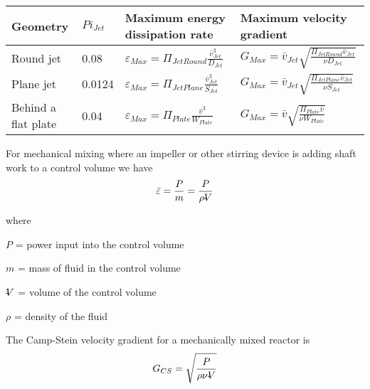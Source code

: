 \documentclass[letterpaper,10pt,english]{sphinxmanual}
\begin{document}
\begin{savenotes}\sphinxattablestart
\raggedright
{}
\label{\detokenize{Rapid_Mix/RM_Intro:id15}}\label{\detokenize{Rapid_Mix/RM_Intro:table-edr-g-equations}}
\sphinxaftercaption
\begin{tabulary}{\linewidth}[t]{|T|T|T|T|}
\hline
\sphinxstyletheadfamily 
Geometry
&
\(Pi_{Jet}\)
&\sphinxstyletheadfamily 
Maximum energy dissipation rate
&\sphinxstyletheadfamily 
Maximum velocity gradient
\\
\hline
Round jet
&
0.08
&
\(\varepsilon_{Max} = \Pi_{JetRound}\frac{   \bar v_{Jet} ^3}{D_{Jet}}\)
&
\(G_{Max} = \bar v_{Jet} \sqrt{\frac{\Pi_{JetRound} \bar v_{Jet} }{\nu D_{Jet}}}\)
\\
\hline
Plane jet
&
0.0124
&
\(\varepsilon_{Max} = \Pi_{JetPlane} \frac{  \bar v_{Jet} ^3}{S_{Jet}}\)
&
\(G_{Max} = \bar v_{Jet}\sqrt{\frac{\Pi_{JetPlane} \bar v_{Jet}}{\nu S_{Jet}}}\)
\\
\hline
Behind a flat plate
&
0.04
&
\(\varepsilon _{Max} = \Pi_{Plate}\frac{\bar v^3}{W_{Plate}}\)
&
\(G_{Max} = \bar v\sqrt{\frac{\Pi_{Plate} \bar v}{\nu W_{Plate}}}\)
\\
\hline
\end{tabulary}
\par
\sphinxattableend\end{savenotes}

For mechanical mixing where an impeller or other stirring device is adding shaft work to a control volume we have
\begin{equation}\label{equation:Rapid_Mix/RM_Intro:Rapid_Mix/RM_Intro:7}
\begin{split}\bar\varepsilon = \frac{P}{m} = \frac{P}{\rho \rlap{-}V}\end{split}
\end{equation}
\begin{DUlineblock}{0em}
\item[] where
\item[] \(P\) = power input into the control volume
\item[] \(m\) = mass of fluid in the control volume
\item[] \(\rlap{-}V\) = volume of the control volume
\item[] \(\rho\) = density of the fluid
\end{DUlineblock}

The Camp-Stein velocity gradient for a mechanically mixed reactor is
\begin{equation}\label{equation:Rapid_Mix/RM_Intro:Rapid_Mix/RM_Intro:8}
\begin{split}G_{CS} = \sqrt{\frac{P}{\rho \nu \rlap{-}V}}\end{split}
\end{equation}
\end{document}
